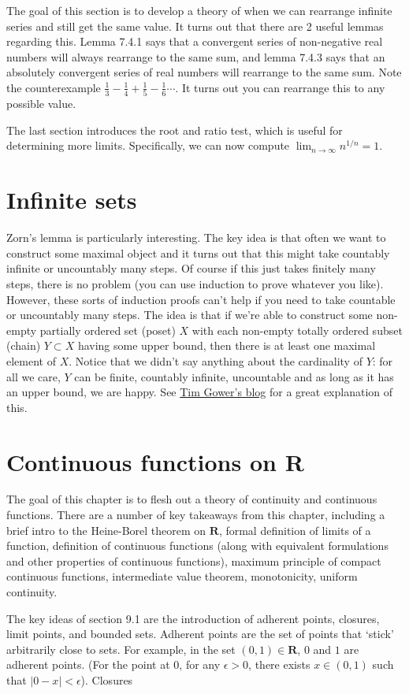 \documentclass[answers,12pt]{exam}
\begin{document}
The goal of this section is to develop a theory of when we can rearrange infinite series and still get the same value.
It turns out that there are 2 useful lemmas regarding this.
Lemma 7.4.1 says that a convergent series of non-negative real numbers will always rearrange to the same sum, and lemma 7.4.3 says that an absolutely convergent series of real numbers will rearrange to the same sum.
Note the counterexample $\frac{1}{3} - \frac{1}{4} + \frac{1}{5} - \frac{1}{6}\cdots$.
It turns out you can rearrange this to any possible value.

The last section introduces the root and ratio test, which is useful for determining more limits.
Specifically, we can now compute $\lim_{n \to \infty} n^{1/n}=1$.

\section{Infinite sets}
Zorn's lemma is particularly interesting.
The key idea is that often we want to construct some maximal object and it turns out that this might take countably infinite or uncountably many steps.
Of course if this just takes finitely many steps, there is no problem (you can use induction to prove whatever you like).
However, these sorts of induction proofs can't help if you need to take countable or uncountably many steps.
The idea is that if we're able to construct some non-empty partially ordered set (poset) $X$ with each non-empty totally ordered subset (chain) $Y \subset X$ having some upper bound, then there is at least one maximal element of $X$.
Notice that we didn't say anything about the cardinality of $Y$: for all we care, $Y$ can be finite, countably infinite, uncountable and as long as it has an upper bound, we are happy.
See \href{https://gowers.wordpress.com/2008/08/12/how-to-use-zorns-lemma/}{Tim Gower's blog} for a great explanation of this.

\section{Continuous functions on R}
The goal of this chapter is to flesh out a theory of continuity and continuous functions.
There are a number of key takeaways from this chapter, including a brief intro to the Heine-Borel theorem on $\mathbf{R}$, formal definition of limits of a function, definition of continuous functions (along with equivalent formulations and other properties of continuous functions), maximum principle of compact continuous functions, intermediate value theorem, monotonicity, uniform continuity.

The key ideas of section 9.1 are the introduction of adherent points, closures, limit points, and bounded sets.
Adherent points are the set of points that `stick' arbitrarily close to sets.
For example, in the set $(0,1) \in \mathbf{R}$, $0$ and $1$ are adherent points.
(For the point at 0, for any $\epsilon > 0$, there exists $x \in (0,1)$ such that $|0-x|< \epsilon$).
Closures 
\end{document}

